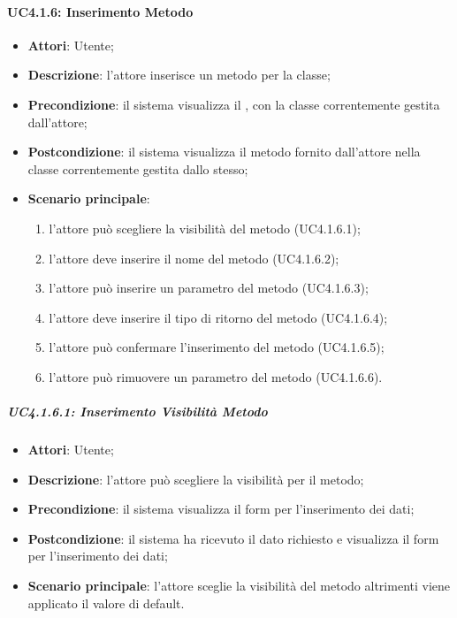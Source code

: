 \paragraph{UC4.1.6: Inserimento Metodo}
\label{UC4.1.6}
\begin{itemize}
	\item \textbf{Attori}: Utente;
	\item \textbf{Descrizione}: l'attore inserisce un metodo per la classe;
	\item \textbf{Precondizione}: il sistema visualizza il , con la classe correntemente gestita dall'attore;
	\item \textbf{Postcondizione}: il sistema visualizza il metodo fornito dall'attore nella classe correntemente gestita dallo stesso;
	\item \textbf{Scenario principale}:
	\begin{enumerate}
		\item l'attore può scegliere la visibilità del metodo (UC4.1.6.1);
		\item l'attore deve inserire il nome del metodo (UC4.1.6.2);
		\item l'attore può inserire un parametro del metodo (UC4.1.6.3);
		\item l'attore deve inserire il tipo di ritorno del metodo (UC4.1.6.4);
		\item l'attore può confermare l'inserimento del metodo (UC4.1.6.5);
		\item l'attore può rimuovere un parametro del metodo (UC4.1.6.6).
	\end{enumerate}
\end{itemize}

\subparagraph{UC4.1.6.1: Inserimento Visibilità Metodo}
\label{UC4.1.6.1}
\begin{itemize}
	\item \textbf{Attori}: Utente;
	\item \textbf{Descrizione}: l'attore può scegliere la visibilità per il metodo;
	\item \textbf{Precondizione}: il sistema visualizza il form per l'inserimento dei dati;
	\item \textbf{Postcondizione}: il sistema ha ricevuto il dato richiesto e visualizza il form per l'inserimento dei dati;
	\item \textbf{Scenario principale}: l'attore sceglie la visibilità del metodo altrimenti viene applicato il valore di default.
\end{itemize}

